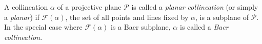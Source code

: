A collineation $\alpha$ of a projective plane $\mathcal{P}$ is called a \textit{planar collineation} (or simply a \textit{planar}) if $\mathcal{F}(\alpha)$, the set of all points and lines fixed by $\alpha$, is a subplane of $\mathcal{P}$. In the special case where $\mathcal{F}(\alpha)$ is a Baer subplane, $\alpha$ is called a \textit{Baer collineation}.
